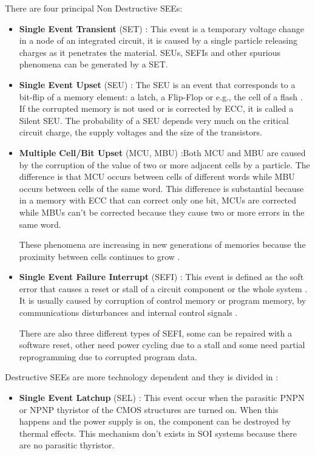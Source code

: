 {{{{{					There are four principal Non Destructive SEEs:
					\begin{itemize}
						\item \textbf{Single Event Transient} (SET) : This event is a temporary voltage change in a node of an integrated circuit, it is caused by a single particle releasing charges as it penetrates the material. SEUs, SEFIs and other spurious phenomena can be generated by a SET.
						
						\item \textbf{Single Event Upset} (SEU) : The SEU is an event that corresponds to a bit-flip of a memory element: a latch, a Flip-Flop or e.g., the cell of a flash . If the corrupted memory is not used or is corrected  by ECC, it is called a Silent SEU. The probability of a SEU depends very much on the critical circuit charge, the supply voltages and the size of the transistors.
						
						\item \textbf{Multiple Cell/Bit Upset} (MCU, MBU) :Both MCU and MBU are caused by the corruption of the value of two or more adjacent cells by a particle. The difference is that MCU occurs between cells of different words while MBU occurs between cells of the same word. This difference is substantial because in a memory with ECC that can correct only one bit, MCUs are corrected while MBUs can't be corrected because they cause two or more errors in the same word.
						
						These phenomena are increasing in new generations of memories because the proximity between cells continues to grow .
						
						\item \textbf{Single Event Failure Interrupt} (SEFI) : This event is defined as the soft error that causes a reset or stall of a circuit component or the whole system . It is usually caused by corruption of control memory or program memory, by communications disturbances and internal control signals .
						
						There are also three different types of SEFI, some can be repaired with a software reset, other need power cycling due to a stall and some need partial reprogramming due to corrupted program data.
						
					\end{itemize}
					
					
					
					
					Destructive SEEs are more technology dependent and they is divided in :
					\begin{itemize}
						\item \textbf{Single Event Latchup} (SEL) : This event occur when the parasitic PNPN or NPNP thyristor of the CMOS structures are turned on. When this happens and the power supply is on, the component can be destroyed by thermal effects. This mechanism don't exists in SOI systems because there are no parasitic thyristor.
						

\end{itemize}}}}}}
